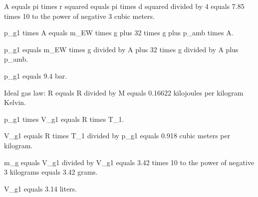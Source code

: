 A equals pi times r squared equals pi times d squared divided by 4 equals 7.85 times 10 to the power of negative 3 cubic meters.  

p_g1 times A equals m_EW times g plus 32 times g plus p_amb times A.  

p_g1 equals m_EW times g divided by A plus 32 times g divided by A plus p_amb.  

p_g1 equals 9.4 bar.  

Ideal gas law:  
R equals R divided by M equals 0.16622 kilojoules per kilogram Kelvin.  

p_g1 times V_g1 equals R times T_1.  

V_g1 equals R times T_1 divided by p_g1 equals 0.918 cubic meters per kilogram.  

m_g equals V_g1 divided by V_g1 equals 3.42 times 10 to the power of negative 3 kilograms equals 3.42 grams.  

V_g1 equals 3.14 liters.